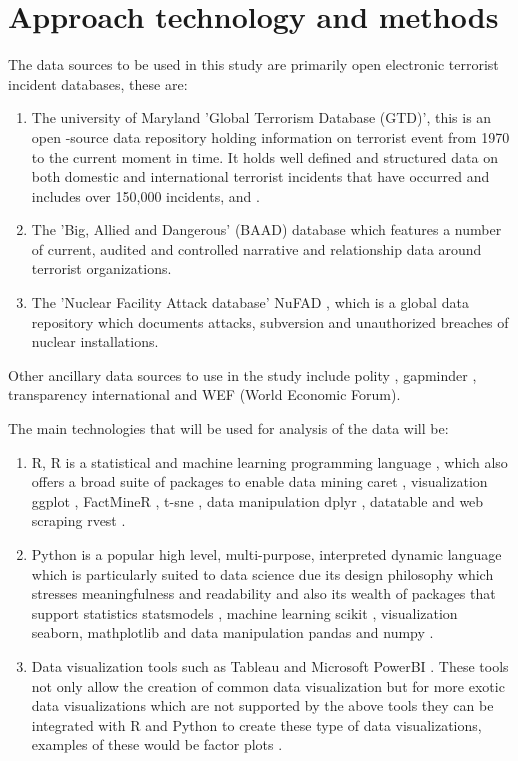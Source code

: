 \documentclass[11pt,twocolumn]{article}
\begin{document}
\section*{\textbf{Approach technology and methods}}
The data sources to be used in this study are primarily open electronic terrorist incident databases, these are:
\begin{enumerate}
\item The university of Maryland 'Global Terrorism Database (GTD)', this is an open -source data repository holding information on terrorist event from 1970 to the current moment in time. It holds well defined and structured data on both domestic and international terrorist incidents that have occurred and includes over 150,000 incidents, \citep{lafree2007introducing} and \citep{lafree2010global}.
\item  The 'Big, Allied and Dangerous' (BAAD) database which features a number of current, audited and controlled narrative and relationship data around terrorist organizations.
\item The 'Nuclear Facility Attack database' NuFAD \citep{NuFADSTART}, which is a global data repository which documents attacks, subversion and unauthorized breaches of nuclear installations.
\end{enumerate}
Other ancillary data sources to use in the study include polity \citep{MarshallJaggers2007}, gapminder \citep{rosling2009gapminder}, transparency international \citep{transparency2015corruption} and WEF (World Economic Forum).
  
The main technologies that will be used for analysis of the data will be:
\begin{enumerate}
\item R, R is a statistical and machine learning programming language \citep{team2015r}, which also offers a broad suite of packages to enable data mining caret \citep{kuhn2015contributions}, visualization ggplot \citep{wickham2016programming},  FactMineR \citep{husson2015r}, t-sne \citep{maaten2008visualizing}, data manipulation dplyr \citep{wickham2015dplyr}, datatable \citep{datatableR} and web scraping rvest \citep{rvestR}.
\item Python \citep{van2014python} is a popular high level, multi-purpose, interpreted dynamic language which is particularly suited to data science due its design philosophy which stresses meaningfulness and readability and also its wealth of packages that support statistics statsmodels , machine learning scikit \citep{buitinck2013api}, visualization seaborn, mathplotlib \citep{haslwanter2016introduction} and data manipulation pandas \citep{mckinney2015pandas} and numpy \citep{oliphant2014numpy}.
\item Data visualization tools such as Tableau \citep{chabot2003tableau} and Microsoft PowerBI \citep{ferrari2016introducing}. These tools not only allow the creation of common data visualization but for more exotic data visualizations which are not supported by the above tools they can be integrated with R and Python to create these type of data visualizations, examples of these would be factor plots \citep{husson2010exploratory}. 
\end{enumerate}
\end{document}

